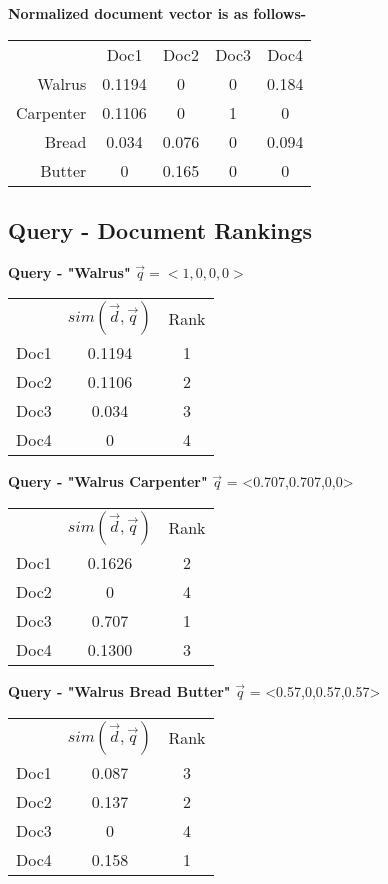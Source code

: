 \documentclass{article}
\begin{document}
\vspace{5mm}
\textbf{Normalized document vector is as follows-}

\begin{tabular}{ r|c|c|c|c| }
\multicolumn{1}{r}{}
 & \multicolumn{1}{c}{Doc1}
 & \multicolumn{1}{c}{Doc2}
 & \multicolumn{1}{c}{Doc3}
 & \multicolumn{1}{c}{Doc4} \\
\cline{2-5}
Walrus & 0.1194 & 0 & 0 & 0.184 \\
\cline{2-5}
Carpenter & 0.1106 & 0 & 1 & 0 \\
\cline{2-5}
Bread & 0.034 & 0.076 & 0 & 0.094 \\
\cline{2-5}
Butter & 0 & 0.165 & 0 & 0 \\
\cline{2-5}
\end{tabular}

\subsection{Query - Document Rankings}

\vspace{5mm}
\textbf{Query - "Walrus"}
$\vec{q} = <1,0,0,0>$
\begin{tabular}{ r|c|c| }
\multicolumn{1}{r}{}
 & \multicolumn{1}{c}{$sim(\vec{d},\vec{q})$}
 & \multicolumn{1}{c}{Rank} \\
\cline{2-3}
Doc1 & 0.1194 & 1 \\
\cline{2-3}
Doc2 & 0.1106 & 2 \\
\cline{2-3}
Doc3 & 0.034 & 3 \\
\cline{2-3}
Doc4 & 0 & 4 \\
\cline{2-3}
\end{tabular}

\vspace{5mm}
\textbf{Query - "Walrus Carpenter"}
$\vec{q}$ = <0.707,0.707,0,0>
\begin{tabular}{ r|c|c| }
\multicolumn{1}{r}{}
 & \multicolumn{1}{c}{$sim(\vec{d},\vec{q})$}
 & \multicolumn{1}{c}{Rank} \\
\cline{2-3}
Doc1 & 0.1626 & 2 \\
\cline{2-3}
Doc2 & 0 & 4 \\
\cline{2-3}
Doc3 & 0.707 & 1 \\
\cline{2-3}
Doc4 & 0.1300 & 3 \\
\cline{2-3}
\end{tabular}

\vspace{5mm}
\textbf{Query - "Walrus Bread Butter"}
$\vec{q}$ = <0.57,0,0.57,0.57>
\begin{tabular}{ r|c|c| }
\multicolumn{1}{r}{}
 & \multicolumn{1}{c}{$sim(\vec{d},\vec{q})$}
 & \multicolumn{1}{c}{Rank} \\
\cline{2-3}
Doc1 & 0.087 & 3 \\
\cline{2-3}
Doc2 & 0.137 & 2 \\
\cline{2-3}
Doc3 & 0 & 4 \\
\cline{2-3}
Doc4 & 0.158 & 1 \\
\cline{2-3}
\end{tabular}
\end{document}
